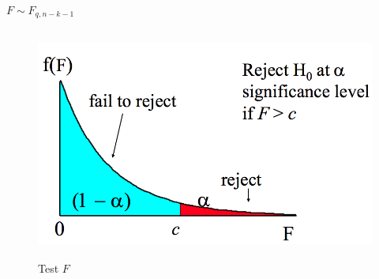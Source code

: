 \documentclass[a4paper,titlepage] {scrartcl}
\begin{document}
$F \sim F_{q,n-k-1}$
\begin{figure}[htbp]
	\centering
		\includegraphics[height=3in]{images/testF.png}
	\caption{Test $F$}
	\label{fig:images_testF}
\end{figure}
\end{document}
